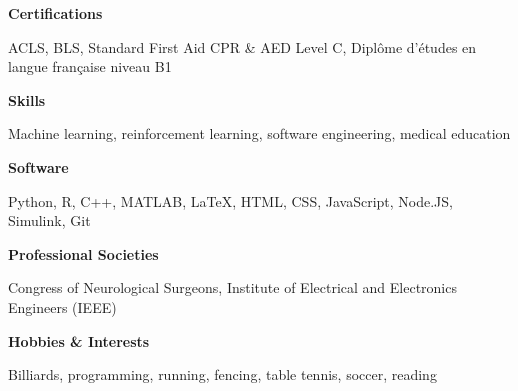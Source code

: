 \documentclass{article}
\begin{document}
\textbf{Certifications} \hfill \parbox[t]{.8\linewidth}{ACLS, BLS, Standard First Aid CPR \& AED Level C, Dipl\^ome d'\'etudes en langue fran\c{c}aise niveau B1}

\textbf{Skills} \hfill \parbox[t]{.8\linewidth}{Machine learning, reinforcement learning, software engineering, medical education}

\textbf{Software} \hfill \parbox[t]{.8\linewidth}{Python, R, C++, MATLAB, \LaTeX, HTML, CSS, JavaScript, Node.JS, Simulink, Git}

\textbf{Professional Societies} \hfill \parbox[t]{0.8\linewidth}{Congress of Neurological Surgeons, Institute of Electrical and Electronics Engineers (IEEE)}

\textbf{Hobbies \& Interests} \hfill \parbox[t]{.8\linewidth}{Billiards, programming, running, fencing, table tennis, soccer, reading}
\end{document}
